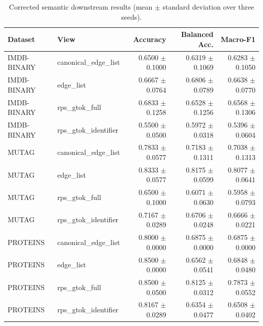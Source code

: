 \begin{table}[t]
\centering
\caption{Corrected semantic downstream results (mean $\pm$ standard deviation over three seeds).}
\begin{tabular}{llrrr}
\toprule
Dataset & View & Accuracy & Balanced Acc. & Macro-F1 \\
\midrule
IMDB-BINARY & canonical_edge_list & 0.6500 $\pm$0.1000 & 0.6319 $\pm$0.1069 & 0.6283 $\pm$0.1050 \\
IMDB-BINARY & edge_list & 0.6667 $\pm$0.0764 & 0.6806 $\pm$0.0789 & 0.6638 $\pm$0.0770 \\
IMDB-BINARY & rps_gtok_full & 0.6833 $\pm$0.1258 & 0.6528 $\pm$0.1256 & 0.6568 $\pm$0.1306 \\
IMDB-BINARY & rps_gtok_identifier & 0.5500 $\pm$0.0500 & 0.5972 $\pm$0.0318 & 0.5396 $\pm$0.0604 \\
MUTAG & canonical_edge_list & 0.7833 $\pm$0.0577 & 0.7183 $\pm$0.1311 & 0.7038 $\pm$0.1313 \\
MUTAG & edge_list & 0.8333 $\pm$0.0577 & 0.8175 $\pm$0.0599 & 0.8077 $\pm$0.0641 \\
MUTAG & rps_gtok_full & 0.6500 $\pm$0.1000 & 0.6071 $\pm$0.0630 & 0.5958 $\pm$0.0793 \\
MUTAG & rps_gtok_identifier & 0.7167 $\pm$0.0289 & 0.6706 $\pm$0.0248 & 0.6666 $\pm$0.0221 \\
PROTEINS & canonical_edge_list & 0.8000 $\pm$0.0000 & 0.6875 $\pm$0.0000 & 0.6875 $\pm$0.0000 \\
PROTEINS & edge_list & 0.8500 $\pm$0.0000 & 0.6562 $\pm$0.0541 & 0.6848 $\pm$0.0480 \\
PROTEINS & rps_gtok_full & 0.8500 $\pm$0.0500 & 0.8125 $\pm$0.0312 & 0.7873 $\pm$0.0552 \\
PROTEINS & rps_gtok_identifier & 0.8167 $\pm$0.0289 & 0.6354 $\pm$0.0477 & 0.6508 $\pm$0.0402 \\
\bottomrule
\end{tabular}
\end{table}
